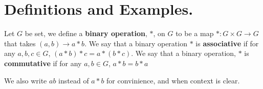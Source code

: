 
\section{Definitions and Examples.}
\label{section1}

\begin{definition}
    Let $G$ be set, we define a  \textbf{binary operation}, $\ast$, on  $G$ to
    be a map  $\ast:G \times G \rightarrow G$ that takes $(a,b) \rightarrow a
    \ast b$. We say that a binary operation $\ast$ is \textbf{associative} if
    for any $a,b,c \in G$,  $(a \ast b) \ast c=a \ast (b \ast c)$. We say that a
    binary operation, $\ast$ is \textbf{commutative} if for any $a,b \in G$,
    $a \ast b=b \ast a$
\end{definition}
 We also write $ab$ instead of  $a \ast b$ for convinience, and when
context is clear.

